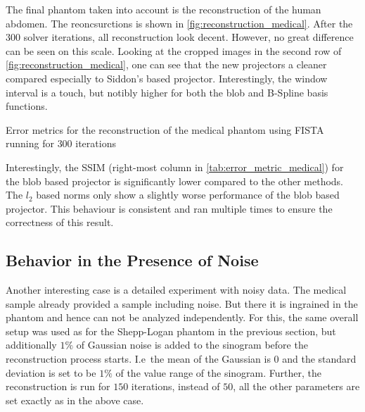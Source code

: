 The final phantom taken into account is the reconstruction of the human abdomen. The reoncsurctions
is shown in \autoref{fig:reconstruction_medical}. After the \(300\) solver iterations, all
reconstruction look decent. However, no great difference can be seen on this scale. Looking at the
cropped images in the second row of \autoref{fig:reconstruction_medical}, one can see that the new
projectors a cleaner compared especially to Siddon's based projector. Interestingly, the window
interval is a touch, but notibly higher for both the blob and B-Spline basis functions.

\begin{table}[h]%
	\centering
	\caption{Error metrics for the reconstruction of the medical phantom using FISTA running for
		\(300\) iterations}%
	\label{tab:error_metric_medical}
\end{table}

Interestingly, the \gls{SSIM} (right-most column in \autoref{tab:error_metric_medical}) for the blob
based projector is significantly lower compared to the other methods. The \(l_2\) based norms only
show a slightly worse performance of the blob based projector. This behaviour is consistent and ran
multiple times to ensure the correctness of this result.

\subsection{Behavior in the Presence of Noise}

Another interesting case is a detailed experiment with noisy data. The medical sample already
provided a sample including noise. But there it is ingrained in the phantom and hence can not be
analyzed independently. For this, the same overall setup was used as for the Shepp-Logan phantom in
the previous section, but additionally \(1\%\) of Gaussian noise is added to the sinogram before the
reconstruction process starts. I.e\ the mean of the Gaussian is \(0\) and the standard deviation is
set to be \(1\%\) of the value range of the sinogram. Further, the reconstruction is run for \(150\)
iterations, instead of \(50\), all the other parameters are set exactly as in the above case.

